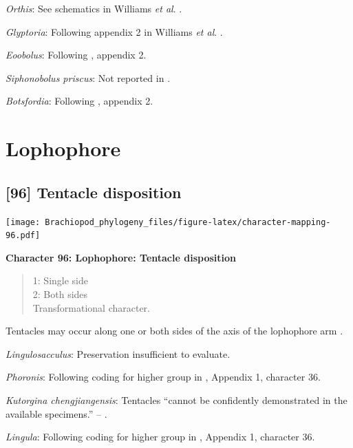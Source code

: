 \documentclass[]{book}
\theoremstyle{definition}
\theoremstyle{definition}
\theoremstyle{definition}
\theoremstyle{remark}
\begin{document}
\emph{Orthis}: See schematics in Williams \emph{et al}.
\citeyearpar{Williams2000BrachiopodaLinguliformea}.

\emph{Glyptoria}: Following appendix 2 in Williams \emph{et al}.
\citeyearpar{Williams1998Thediversity}.

\emph{Eoobolus}: Following \citet{Williams1998Thediversity}, appendix 2.

\emph{Siphonobolus priscus}: Not reported in
\citet{Williams2000BrachiopodaLinguliformea}.

\emph{Botsfordia}: Following \citet{Williams1998Thediversity}, appendix
2.

\hypertarget{lophophore}{%
\section{Lophophore}\label{lophophore}}

\hypertarget{tentacle-disposition}{%
\subsection*{{[}96{]} Tentacle disposition}\label{tentacle-disposition}}

\texttt{[image: Brachiopod\_phylogeny\_files/figure-latex/character-mapping-96.pdf]}

\textbf{Character 96: Lophophore: Tentacle disposition}

\begin{quote}
1: Single side\\
2: Both sides\\
Transformational character.
\end{quote}

Tentacles may occur along one or both sides of the axis of the
lophophore arm \citep{Carlson1995Phylogeneticrelationships}.

\emph{Lingulosacculus}: Preservation insufficient to evaluate.

\emph{Phoronis}: Following coding for higher group in
\citet{Carlson1995Phylogeneticrelationships}, Appendix 1, character 36.

\emph{Kutorgina chengjiangensis}: Tentacles ``cannot be confidently
demonstrated in the available specimens.'' --
\citet{Zhang2007Rhynchonelliformeanbrachiopods}.

\emph{Lingula}: Following coding for higher group in
\citet{Carlson1995Phylogeneticrelationships}, Appendix 1, character 36.
\end{document}
